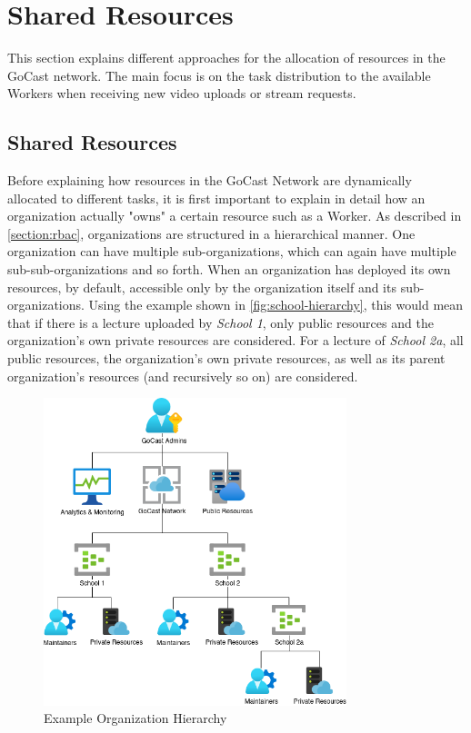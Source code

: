 \section{Shared Resources}\label{section:shared-resources}

This section explains different approaches for the allocation of resources in the GoCast network. The main focus is on the task distribution to the available Workers when receiving new video uploads or stream requests.

\subsection{Shared Resources}

Before explaining how resources in the GoCast Network are dynamically allocated to different tasks, it is first important to explain in detail how an organization actually "owns" a certain resource such as a Worker. As described in \autoref{section:rbac}, organizations are structured in a hierarchical manner. One organization can have multiple sub-organizations, which can again have multiple sub-sub-organizations and so forth. When an organization has deployed its own resources, by default, accessible only by the organization itself and its sub-organizations. Using the example shown in \autoref{fig:school-hierarchy}, this would mean that if there is a lecture uploaded by \textit{School 1}, only public resources and the organization's own private resources are considered. For a lecture of \textit{School 2a}, all public resources, the organization's own private resources, as well as its parent organization's resources (and recursively so on) are considered. 

\begin{figure}[htpb]
    \centering
    \includegraphics[width=250pt]{images/SchoolHierarchy.png}
    \caption[Example Organization Hierarchy]{Example Organization Hierarchy}\label{fig:school-hierarchy}
\end{figure}

